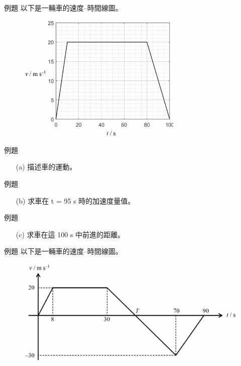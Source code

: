 \documentclass[beamer=true]{standalone}
\begin{document}
\begin{frame}[t]{例題}
    以下是一輛車的速度–時間線圖。
    \begin{figure}[h!]
        \centering
        \includegraphics[width=0.7\textwidth]{../../assets/595e8206.png}
    \end{figure}
\end{frame}
\begin{frame}[t]{例題}
    \begin{itemize}
        \item [(a)]描述車的運動。
    \end{itemize}
\end{frame}
\begin{frame}[t]{例題}
    \begin{itemize}
        \item [(b)]求車在 t = 95 s 時的加速度量值。
    \end{itemize}
\end{frame}
\begin{frame}[t]{例題}
    \begin{itemize}
        \item [(c)]求車在這 100 s 中前進的距離。
    \end{itemize}
\end{frame}
\begin{frame}{例題}
    以下是一輛車的速度–時間線圖。
    \begin{figure}[h!]
        \centering
        \includegraphics[width=\textwidth]{../../assets/c30be131.png}
    \end{figure}
\end{frame}
\end{document}
